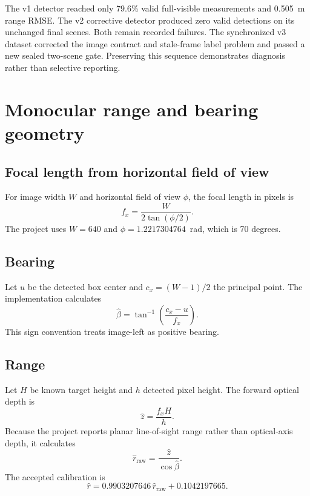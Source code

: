 \documentclass[11pt,oneside,openany]{book}
\begin{document}
The v1 detector reached only 79.6\% valid full-visible measurements and 0.505~m range RMSE. The v2 corrective detector produced zero valid detections on its unchanged final scenes. Both remain recorded failures. The synchronized v3 dataset corrected the image contract and stale-frame label problem and passed a new sealed two-scene gate. Preserving this sequence demonstrates diagnosis rather than selective reporting.

\chapter{Monocular range and bearing geometry}

\section{Focal length from horizontal field of view}

For image width $W$ and horizontal field of view $\phi$, the focal length in pixels is
\begin{equation}
f_x = \frac{W}{2\tan(\phi/2)}.
\end{equation}
The project uses $W=640$ and $\phi=1.2217304764$~rad, which is 70 degrees.

\section{Bearing}

Let $u$ be the detected box center and $c_x=(W-1)/2$ the principal point. The implementation calculates
\begin{equation}
\hat\beta=\tan^{-1}\left(\frac{c_x-u}{f_x}\right).
\end{equation}
This sign convention treats image-left as positive bearing.

\section{Range}

Let $H$ be known target height and $h$ detected pixel height. The forward optical depth is
\begin{equation}
\hat z=\frac{f_xH}{h}.
\end{equation}
Because the project reports planar line-of-sight range rather than optical-axis depth, it calculates
\begin{equation}
\hat r_{\mathrm{raw}}=\frac{\hat z}{\cos\hat\beta}.
\end{equation}
The accepted calibration is
\begin{equation}
\hat r=0.9903207646\,\hat r_{\mathrm{raw}}+0.1042197665.
\end{equation}
\end{document}
